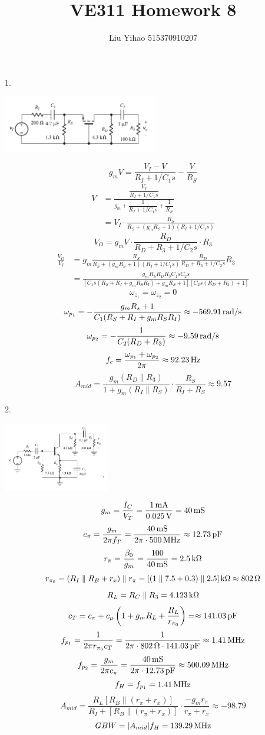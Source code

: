 \documentclass[landscape,a4paper]{article}
\title{VE311 Homework 8}
\author{Liu Yihao 515370910207}
\date{}
\newcommand{\unit}[1]{{\rm\,#1}}
\begin{document}
\pagestyle{empty}

\begin{multicols}{3}
\scriptsize
1.
\begin{center}
\includegraphics[height=2.5cm]{8.1.png}
\end{center}
$$g_mV=\frac{V_I-V}{R_I+1/C_1s}-\frac{V}{R_S}$$
$$\begin{aligned}V&=\frac{\dfrac{V_I}{R_I+1/C_1s}}{g_m+\dfrac{1}{R_I+1/C_1s}+\dfrac{1}{R_S}}\\&=V_I\cdot\frac{R_S}{R_S+(g_mR_S+1)(R_I+1/C_1s)}\end{aligned}$$
$$V_O=g_mV\cdot\frac{R_D}{R_D+R_3+1/C_2s}\cdot R_3$$
\begin{align*}
\frac{V_O}{V_I}&=g_m\frac{R_S}{R_S+(g_mR_S+1)(R_I+1/C_1s)}\frac{R_D}{R_D+R_3+1/C_2s} R_3\\
&=\frac{g_mR_SR_DR_3C_1sC_2s}{[C_1s(R_S+R_I+g_mR_SR_I)+g_mR_S+1][C_2s(R_D+R_3)+1]}
\end{align*}
$$\omega_{z_1}=\omega_{z_2}=0$$
$$\omega_{p_1}=-\frac{g_mR_s+1}{C_1(R_S+R_I+g_mR_SR_I)}\approx-569.91\unit{rad/s}$$
$$\omega_{p_2}=-\frac{1}{C_2(R_D+R_3)}\approx-9.59\unit{rad/s}$$
$$f_c=\frac{\omega_{p_1}+\omega_{p_2}}{2\pi}\approx92.23\unit{Hz}$$
$$A_{mid}=\frac{g_m(R_D\parallel R_3)}{1+g_m(R_I\parallel R_S)}\cdot\frac{R_S}{R_I+R_S}\approx9.57$$

2.
\begin{center}
\includegraphics[height=3cm]{8.2.png}
\end{center}
$$g_m=\frac{I_C}{V_T}=\frac{1\unit{mA}}{0.025\unit{V}}=40\unit{mS}$$
$$c_\pi=\frac{g_m}{2\pi f_T}=\frac{40\unit{mS}}{2\pi\cdot500\unit{MHz}}\approx12.73\unit{pF}$$
$$r_\pi=\frac{\beta_0}{g_m}=\frac{100}{40\unit{mS}}=2.5\unit{k\Omega}$$
$$r_{\pi_0}=(R_I\parallel R_B+r_x)\parallel r_\pi=[(1\parallel7.5+0.3)\parallel 2.5]\unit{k\Omega}\approx802\unit{\Omega}$$
$$R_L=R_C\parallel R_3=4.123\unit{k\Omega}$$
$$c_T=c_\pi+c_\mu\left(1+g_mR_L+\frac{R_L}{r_{\pi_0}}\right)=\approx141.03\unit{pF}$$
$$f_{p_1}=\frac{1}{2\pi r_{\pi_0}c_T}=\frac{1}{2\pi\cdot802\unit{\Omega}\cdot141.03\unit{pF}}\approx1.41\unit{MHz}$$
$$f_{p_2}=\frac{g_m}{2\pi c_\pi}=\frac{40\unit{mS}}{2\pi\cdot12.73\unit{pF}}\approx500.09\unit{MHz}$$
$$f_H=f_{p_1}=1.41\unit{MHz}$$
$$A_{mid}=\frac{R_L[R_B\parallel(r_\pi+r_x)]}{R_I+[R_B\parallel(r_\pi+r_x)]}\cdot\frac{-g_mr_\pi}{r_\pi+r_x}\approx-98.79$$
$$GBW=|A_{mid}|f_H=139.29\unit{MHz}$$


\end{multicols}
\end{document}
